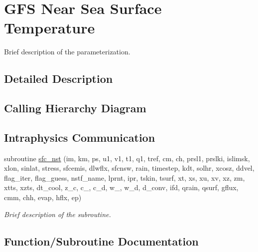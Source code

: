 \hypertarget{group___g_f_s___n_s_s_t}{}\section{G\+FS Near Sea Surface Temperature}
\label{group___g_f_s___n_s_s_t}


Brief description of the parameterization.  




\subsection{Detailed Description}
\hypertarget{group___g_f_s___n_s_s_t_diagram}{}\subsection{Calling Hierarchy Diagram}\label{group___g_f_s___n_s_s_t_diagram}
\hypertarget{group___g_f_s___n_s_s_t_intraphysics}{}\subsection{Intraphysics Communication}\label{group___g_f_s___n_s_s_t_intraphysics}
\begin{DoxyCompactItemize}
\item 
subroutine \hyperlink{group___g_f_s___n_s_s_t_gaed7d47bed74095e3d9fb0c30814ffa63}{sfc\+\_\+nst} (im, km, ps, u1, v1, t1, q1, tref, cm, ch, prsl1, prslki, islimsk, xlon, sinlat, stress, sfcemis, dlwflx, sfcnsw, rain, timestep, kdt, solhr, xcosz, ddvel, flag\+\_\+iter, flag\+\_\+guess, nstf\+\_\+name, lprnt, ipr, tskin, tsurf, xt, xs, xu, xv, xz, zm, xtts, xzts, dt\+\_\+cool, z\+\_\+c, c\+\_, c\+\_\+d, w\+\_, w\+\_\+d, d\+\_\+conv, ifd, qrain, qsurf, gflux, cmm, chh, evap, hflx, ep)
\begin{DoxyCompactList}\small\item\em Brief description of the subroutine. \end{DoxyCompactList}\end{DoxyCompactItemize}


\subsection{Function/\+Subroutine Documentation}
\mbox{\label{group___g_f_s___n_s_s_t_gaed7d47bed74095e3d9fb0c30814ffa63}} 
